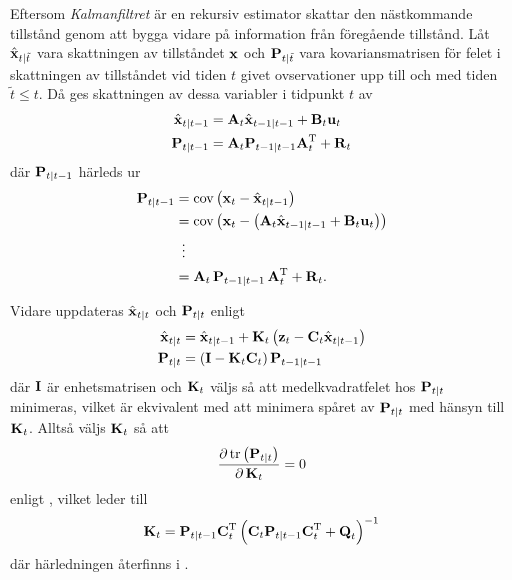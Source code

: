 \documentclass[11pt]{article}
\newcommand{\bfr}[1]{\textbf{\textrm{{#1}}}}
\begin{document}
\begin{flushleft}
Eftersom \emph{Kalmanfiltret} är en rekursiv estimator skattar den nästkommande tillstånd genom att bygga vidare på information från föregående tillstånd. Låt $\hat{\bfr{x}}_{t\vert \tilde{t}}$ vara skattningen av tillståndet $\bfr{x}$ och $\bfr{P}_{t\vert \tilde{t}}$ vara kovariansmatrisen för felet i skattningen av tillståndet vid tiden $t$ givet ovservationer upp till och med tiden $\tilde{t}\leq t$. Då ges skattningen av dessa variabler i tidpunkt $t$ av
\begin{align*}
	\hat{\bfr{x}}_{t\vert t-1} &= \bfr{A}_{t}\hat{\bfr{x}}_{t-1\vert t-1} + \bfr{B}_{t}\bfr{u}_{t} \\
	\bfr{P}_{t\vert t-1} & = \bfr{A}_{t}\bfr{P}_{t-1\vert t-1}\bfr{A}_{t}^{\mathrm{T}} + \bfr{R}_t
\end{align*}
där $\bfr{P}_{t\vert t-1}$ härleds ur
\begin{align*}
	\bfr{P}_{t\vert t-1} &= \mathrm{cov}\left(\bfr{x}_{t}-\hat{\bfr{x}}_{t\vert t-1}\right) \\
	&= \mathrm{cov}\left(\bfr{x}_{t}-\left(\bfr{A}_{t}\hat{\bfr{x}}_{t-1\vert t-1} + \bfr{B}_{t}\bfr{u}_{t}\right)\right) \\
	&\hspace{.5em}\vdots \\
	&= \bfr{A}_{t}\,\bfr{P}_{t-1\vert t-1}\,\bfr{A}_{t}^{\mathrm{T}} + \bfr{R}_{t}.
\end{align*}

Vidare uppdateras $\hat{\bfr{x}}_{t\vert t}$ och $\bfr{P}_{t\vert t}$ enligt
\begin{align*}
	\hat{\bfr{x}}_{t\vert t} &= \hat{\bfr{x}}_{t\vert t-1} + \bfr{K}_{t}\left(\bfr{z}_{t} - \bfr{C}_{t}\hat{\bfr{x}}_{t\vert t-1}\right) \\
	\bfr{P}_{t\vert t} &= \left(\bfr{I} - \bfr{K}_{t}\bfr{C}_{t}\right)\bfr{P}_{t-1\vert t-1}
\end{align*}
där $\bfr{I}$ är enhetsmatrisen och $\bfr{K}_{t}$ väljs så att medelkvadratfelet hos $\bfr{P}_{t\vert t}$ minimeras, vilket är ekvivalent med att minimera spåret av $\bfr{P}_{t\vert t}$ med hänsyn till $\bfr{K}_{t}$. Alltså väljs $\bfr{K}_{t}$ så att
\begin{align*}
	\frac{\partial\,\mathrm{tr}\left(\bfr{P}_{t\vert t}\right)}{\partial\,\bfr{K}_{t}} = 0
\end{align*}
enligt \cite{trace}, vilket leder till
\begin{align*}
	\bfr{K}_{t} = \bfr{P}_{t\vert t-1}\bfr{C}_{t}^{\mathrm{T}}\left(\bfr{C}_{t}\bfr{P}_{t\vert t-1}\bfr{C}_{t}^{\mathrm{T}} + \bfr{Q}_{t}\right)^{-1}
\end{align*}
där härledningen återfinns i \cite{filtering}. 


\end{flushleft}
\end{document}
